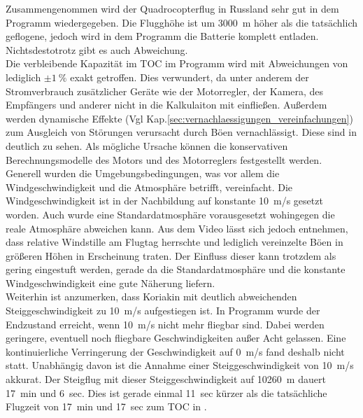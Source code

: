 Zusammengenommen wird der Quadrocopterflug in Russland sehr gut in dem Programm wiedergegeben. Die Flugghöhe ist um \SI{3000}{m} höher als die tatsächlich geflogene, jedoch wird in dem Programm die Batterie komplett entladen. Nichtsdestotrotz gibt es auch Abweichung.\\
Die verbleibende Kapazität im TOC im Programm wird mit Abweichungen von lediglich \ensuremath{\pm\SI{1}{\%}} exakt getroffen. Dies verwundert, da unter anderem der Stromverbrauch zusätzlicher Geräte wie der Motorregler, der Kamera, des Empfängers und anderer nicht in die Kalkulaiton mit einfließen. Außerdem werden dynamische Effekte (Vgl Kap.\ref{sec:vernachlaessigungen_vereinfachungen}) zum Ausgleich von Störungen verursacht durch Böen vernachlässigt. Diese sind in \cite{Anderson.2018} deutlich zu sehen. Als mögliche Ursache können die konservativen Berechnungsmodelle des Motors und des Motorreglers festgestellt werden. Generell wurden die Umgebungsbedingungen, was vor allem die Windgeschwindigkeit und die Atmosphäre betrifft, vereinfacht. Die Windgeschwindigkeit ist in der Nachbildung auf konstante \SI{10}{m/s} gesetzt worden. Auch wurde eine Standardatmosphäre vorausgesetzt wohingegen die reale Atmosphäre abweichen kann. Aus dem Video lässt sich jedoch entnehmen, dass relative Windstille am Flugtag herrschte und lediglich vereinzelte Böen in größeren Höhen in Erscheinung traten. Der Einfluss dieser kann trotzdem als gering eingestuft werden, gerade da die Standardatmosphäre und die konstante Windgeschwindigkeit eine gute Näherung liefern. \\
Weiterhin ist anzumerken, dass Koriakin mit deutlich abweichenden Steiggeschwindigkeit zu \SI{10}{m/s} aufgestiegen ist. In Programm wurde der Endzustand erreicht, wenn \SI{10}{m/s} nicht mehr fliegbar sind. Dabei werden geringere, eventuell noch fliegbare Geschwindigkeiten außer Acht gelassen. Eine kontinuierliche Verringerung der Geschwindigkeit auf \SI{0}{m/s} fand deshalb nicht statt. Unabhängig davon ist die Annahme einer Steiggeschwindigkeit von \SI{10}{m/s} akkurat. Der Steigflug mit dieser Steiggeschwindigkeit auf \SI{10260}{m} dauert \SI{17}{min} und \SI{6}{sec}. Dies ist gerade einmal \SI{11}{sec} kürzer als die tatsächliche Flugzeit von \SI{17}{min} und \SI{17}{sec} zum TOC in \cite{Anderson.2018}.\\
